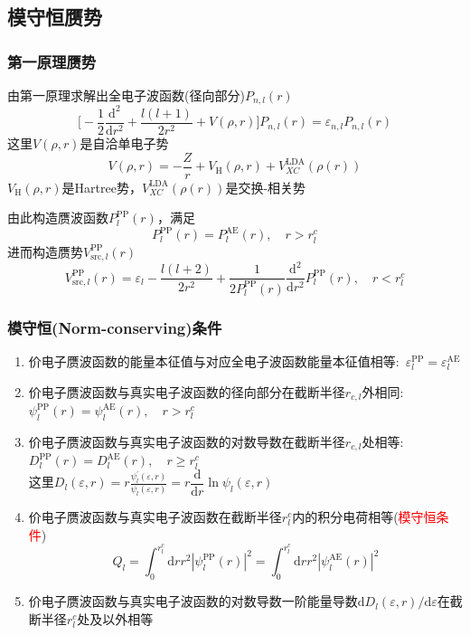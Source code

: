 {\subsection{模守恒赝势}
\frame
{
	\frametitle{第一原理赝势}
		由第一原理求解出全电子波函数(径向部分)$P_{n,l}(r)$
			\begin{displaymath}
				\bigg[-\dfrac12\dfrac{\mathrm{d}^2}{\mathrm{d}r^2}+\dfrac{l(l+1)}{2r^2}+V(\rho,r)\bigg]P_{n,l}(r)=\varepsilon_{n,l}P_{n,l}(r)
			\end{displaymath}
			这里$V(\rho,r)$是自洽单电子势
			$$V(\rho,r)=-\frac{Z}r+V_{\mathrm H}(\rho,r)+V_{XC}^{\mathrm{LDA}}(\rho(r))$$
			$V_{\mathrm H}(\rho,r)$是\textrm{Hartree}势，$V_{XC}^{\mathrm{LDA}}(\rho(r))$是交换-相关势

			由此构造赝波函数$P_l^{\mathrm{PP}}(r)$，满足
			$$P_l^{\mathrm{PP}}(r)=P_l^{\mathrm{AE}}(r),\quad r>r_{l}^c$$
			进而构造赝势$V_{\mathrm{src},l}^{\mathrm{PP}}(r)$
			$$V_{\mathrm{src},l}^{\mathrm{PP}}(r)=\varepsilon_l-\dfrac{l(l+2)}{2r^2}+\dfrac{1}{2P_l^{\mathrm{PP}}(r)}\dfrac{\mathrm{d}^2}{\mathrm{d}r^2}P_l^{\mathrm{PP}}(r),\quad r<r_{l}^c$$
}

\frame
{
	\frametitle{模守恒\textrm{(Norm-conserving)}条件}
	\begin{enumerate}
		\item 价电子赝波函数的能量本征值与对应全电子波函数能量本征值相等:~$\varepsilon_l^{\mathrm{PP}}=\varepsilon_l^{\mathrm{AE}}$
		\item 价电子赝波函数与真实电子波函数的径向部分在截断半径$r_{c,l}$外相同:~$\psi_l^{\mathrm{PP}}(r)=\psi_l^{\mathrm{AE}}(r),\quad r>r_{l}^c$
		\item 价电子赝波函数与真实电子波函数的对数导数在截断半径$r_{c,l}$处相等:~$D_l^{\mathrm{PP}}(r)=D_l^{\mathrm{AE}}(r),\quad r\geqslant r_{l}^c$\\
		这里$D_l(\varepsilon,r)=r\frac{\psi_l^{\prime}(\varepsilon,r)}{\psi_l(\varepsilon,r)}=r\dfrac{\mathrm{d}}{\mathrm{d}r}\ln\psi_l(\varepsilon,r)$
		\item 价电子赝波函数与真实电子波函数在截断半径$r_{l}^c$内的积分电荷相等(\textcolor{red}{模守恒条件})
			$$Q_l=\int_0^{r_{l}^c}\mathrm{d}rr^2|\psi_l^{\mathrm{PP}}(r)|^2=\int_0^{r_{l}^c}\mathrm{d}rr^2|\psi_l^{\mathrm{AE}}(r)|^2$$
		\item 价电子赝波函数与真实电子波函数的对数导数一阶能量导数$\mathrm{d}D_l(\varepsilon,r)/\mathrm{d}\varepsilon$在截断半径$r_{l}^c$处及以外相等
	\end{enumerate}
}

}
